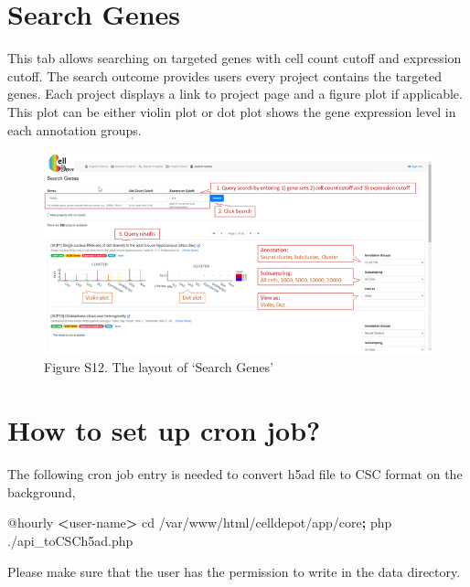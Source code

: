 \documentclass[
]{book}
\newenvironment{Shaded}{\begin{snugshade}}{\end{snugshade}}
\newcommand{\ExtensionTok}[1]{#1}
\newcommand{\KeywordTok}[1]{\textcolor[rgb]{0.13,0.29,0.53}{\textbf{#1}}}
\newcommand{\NormalTok}[1]{#1}
\newcommand{\OperatorTok}[1]{\textcolor[rgb]{0.81,0.36,0.00}{\textbf{#1}}}
\begin{document}
\hypertarget{search-genes}{%
\section{Search Genes}\label{search-genes}}

This tab allows searching on targeted genes with cell count cutoff and expression cutoff. The search outcome provides users every project contains the targeted genes. Each project displays a link to project page and a figure plot if applicable. This plot can be either violin plot or dot plot shows the gene expression level in each annotation groups.

\begin{figure}
\centering
\includegraphics{figures/S12.png}
\caption{Figure S12. The layout of `Search Genes'}
\end{figure}

\hypertarget{how-to-set-up-cron-job}{%
\section{How to set up cron job?}\label{how-to-set-up-cron-job}}

The following cron job entry is needed to convert h5ad file to CSC format on the background,

\begin{Shaded}
\begin{Highlighting}[]
\ExtensionTok{@hourly} \OperatorTok{\textless{}}\NormalTok{user{-}name}\OperatorTok{\textgreater{}}\NormalTok{ cd /var/www/html/celldepot/app/core}\KeywordTok{;} \ExtensionTok{php}\NormalTok{ ./api\_toCSCh5ad.php}
\end{Highlighting}
\end{Shaded}

Please make sure that the user has the permission to write in the data directory.

  
\end{document}
